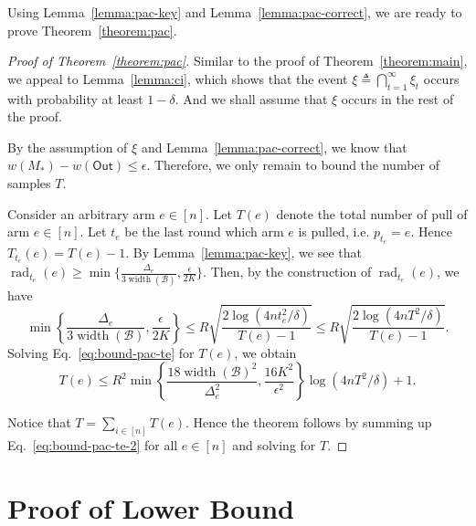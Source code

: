 \documentclass{article}
\newcommand{\B}{\mathcal B}
\DeclareMathOperator{\rank}{width}
\DeclareMathOperator{\rad}{rad}
\newcommand{\out}{\mathsf{Out}}
\begin{document}
Using Lemma~\ref{lemma:pac-key} and Lemma~\ref{lemma:pac-correct}, we are ready to prove Theorem~\ref{theorem:pac}.
\begin{proof}[Proof of Theorem~\ref{theorem:pac}]
Similar to the proof of Theorem~\ref{theorem:main}, we appeal to Lemma~\ref{lemma:ci}, which shows that the event $\xi \triangleq \bigcap_{t=1}^\infty \xi_t$ occurs with probability at least $1-\delta$.
And we shall assume that $\xi$ occurs in the rest of the proof.

By the assumption of $\xi$ and Lemma~\ref{lemma:pac-correct}, we know that $w(M_*)-w(\out) \le \epsilon$. Therefore, we only remain to bound the number of samples $T$.

Consider an arbitrary arm $e\in [n]$.
Let $T(e)$ denote the total number of pull of arm $e\in [n]$.
Let $t_e$ be the last round which arm $e$ is pulled, i.e. $p_{t_e} = e$. 
Hence $T_{t_e}(e) = T(e) - 1$.
By Lemma~\ref{lemma:pac-key}, we see that 
$\rad_{t_e}(e) \ge \min\{\frac{\Delta_e}{3\rank(\B)},\frac{\epsilon}{2K}\}$.
Then, by the construction of $\rad_{t_e}(e)$, we have
\begin{equation}
\min\left\{\frac{\Delta_e}{3\rank(\B)},\frac{\epsilon}{2K}\right\} \le 
R\sqrt{\frac{2\log\left(4n t_e^2/\delta\right)}{T(e)-1}} \le
R\sqrt{\frac{2\log\left(4n T^2/\delta\right)}{T(e)-1}}.
\label{eq:bound-pac-te}
\end{equation}
Solving Eq.~\eqref{eq:bound-pac-te} for $T(e)$, we obtain
\begin{equation}
\label{eq:bound-pac-te-2}
T(e) \le R^2\min\left\{\frac{18 \rank(\B)^2}{\Delta_e^2},\frac{16K^2}{\epsilon^2}\right\} \log(4nT^2/\delta)+1.
\end{equation}

Notice that $T=\sum_{i\in[n]} T(e)$. 
Hence the theorem follows by summing up Eq.~\eqref{eq:bound-pac-te-2} for all $e\in [n]$ and solving for $T$.
\end{proof}



\section{Proof of Lower Bound}
\lowerbound*
\end{document}
